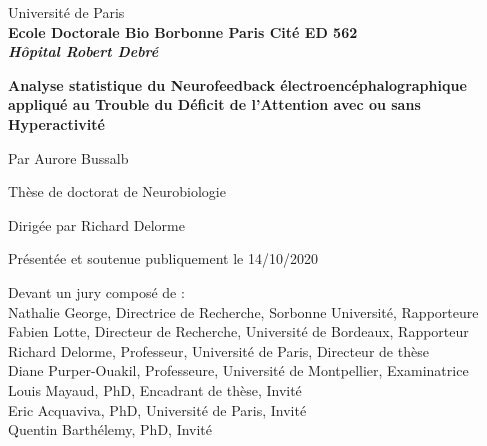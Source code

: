 
\begin{titlepage}

\vskip 1in

\begin{center}
{\LARGE Université de Paris} \\
\vskip 0in
\textbf{Ecole Doctorale Bio Borbonne Paris Cité ED 562} \\
\vskip 0in
\textbf{\textit{Hôpital Robert Debré}} \\
\vskip 0.3in

\Huge \textbf{Analyse statistique du Neurofeedback électroencéphalographique appliqué au Trouble du Déficit de l'Attention avec ou sans Hyperactivité}

\vskip 0.3in

%

{\Large Par Aurore Bussalb} \\

\vskip 0.2in

{\large Thèse de doctorat de Neurobiologie} \\

\vskip 0.15in

{\large Dirigée par Richard Delorme} \\

\vskip 0.1in

{\normalsize Présentée et soutenue publiquement le 14/10/2020} \\
\end{center}
\vskip 0.20in

\noindent Devant un jury composé de : \\%
\noindent Nathalie George, Directrice de Recherche, Sorbonne Université, Rapporteure \\
\noindent Fabien Lotte, Directeur de Recherche, Université de Bordeaux, Rapporteur \\
\noindent Richard Delorme, Professeur, Université de Paris, Directeur de thèse \\
\noindent Diane Purper-Ouakil, Professeure, Université de Montpellier, Examinatrice \\
\noindent Louis Mayaud, PhD, Encadrant de thèse, Invité \\
\noindent Eric Acquaviva, PhD, Université de Paris, Invité \\
\noindent Quentin Barthélemy, PhD, Invité \\


\end{titlepage}

